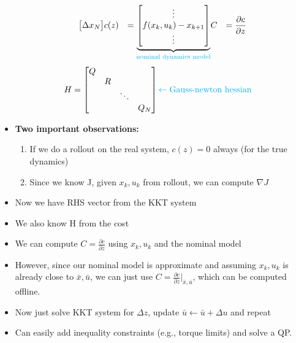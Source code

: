 \documentclass[11pt]{article}
\begin{document}
\begin{itemize}
\begin{align*}
\begin{bmatrix}
            \Delta x_N
        \end{bmatrix}
        &
        c(z) &= 
        \underbrace{\begin{bmatrix}
            \vdots \\
            f(x_k,u_k) - x_{k+1}
            \\
            \vdots
        \end{bmatrix}}_{\textcolor{cyan}{\text{nominal dynamics model}}}
        & 
        C &= \frac{\partial c}{\partial z}
    \end{align*}
    \begin{align*}
        H &= \begin{bmatrix}
            Q & & & \\
            & R & & \\
            & & \ddots & \\
            & & & Q_N
        \end{bmatrix}
        \textcolor{cyan}{\leftarrow \text{Gauss-newton hessian}}
    \end{align*}
    \item \textbf{Two important observations:}
    \begin{enumerate}
        \item If we do a rollout on the real system, $c(z) = 0$ always (for the true dynamics)
        \item Since we know J, given $x_k,u_k$ from rollout, we can compute $\nabla J$
    \end{enumerate}
    \item Now we have RHS vector from the KKT system
    \item We also know H from the cost
    \item We can compute $C = \frac{\partial c}{\partial z}$ using $x_k,u_k$ and the nominal model
    \item However, since our nominal model is approximate and assuming $x_k,u_k$ is already close to $\bar{x},\bar{u}$, we can just use $C = \frac{\partial c}{\partial z}|_{\bar{x},\bar{u}}$, which can be computed offline.
    \item Now just solve KKT system for $\Delta z$, update $\bar{u}\leftarrow \bar{u}+\Delta u$ and repeat
    \item Can easily add inequality constraints (e.g., torque limits) and solve a QP.
\end{itemize}
\end{document}
